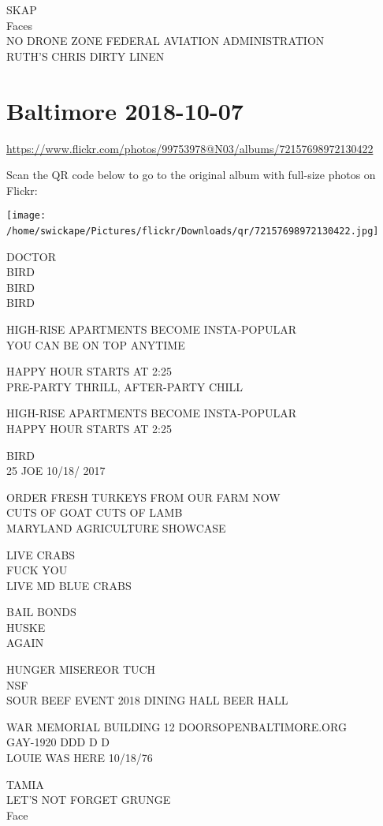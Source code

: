 \documentclass[10pt,letterpaper]{article}
\begin{document}
SKAP\\
Faces\\
NO DRONE ZONE FEDERAL AVIATION ADMINISTRATION\\
RUTH'S CHRIS DIRTY LINEN
\

\section*{Baltimore 2018-10-07}

\url{https://www.flickr.com/photos/99753978@N03/albums/72157698972130422}

Scan the QR code below to go to the original album with full-size photos on Flickr:

\texttt{[image: /home/swickape/Pictures/flickr/Downloads/qr/72157698972130422.jpg]}
\

DOCTOR\\
BIRD\\
BIRD\\
BIRD

HIGH{-}RISE APARTMENTS BECOME INSTA{-}POPULAR\\
YOU CAN BE ON TOP ANYTIME

HAPPY HOUR STARTS AT 2:25\\
PRE{-}PARTY THRILL, AFTER{-}PARTY CHILL

HIGH{-}RISE APARTMENTS BECOME INSTA{-}POPULAR\\
HAPPY HOUR STARTS AT 2:25

BIRD\\
25 JOE 10/18/ 2017

ORDER FRESH TURKEYS FROM OUR FARM NOW\\
CUTS OF GOAT CUTS OF LAMB\\
MARYLAND AGRICULTURE SHOWCASE

LIVE CRABS\\
FUCK YOU\\
LIVE MD BLUE CRABS

BAIL BONDS\\
HUSKE\\
AGAIN

HUNGER MISEREOR TUCH\\
NSF\\
SOUR BEEF EVENT 2018 DINING HALL BEER HALL

WAR MEMORIAL BUILDING 12 DOORSOPENBALTIMORE.ORG\\
GAY{-}1920 DDD D D\\
LOUIE WAS HERE 10/18/76

TAMIA\\
LET'S NOT FORGET GRUNGE\\
Face
\end{document}
